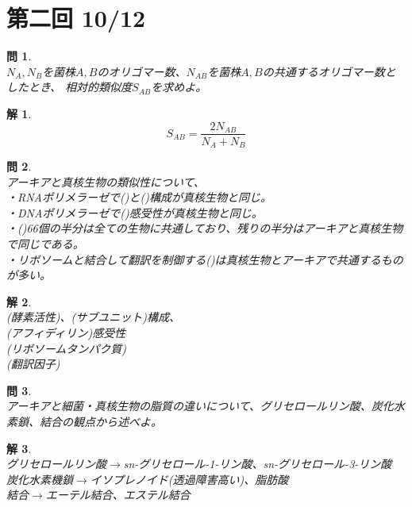 \documentclass{jsarticle}
\newtheorem{pro}{問}[section]
\newtheorem{ans}{解}[section]
\begin{document}
\newpage
\noindent
\section{第二回 10/12}
\noindent
\begin{pro}~\\
    \(N_{A},N_{B}\)を菌株\(A,B\)のオリゴマー数、\(N_{AB}\)を菌株\(A,B\)の共通するオリゴマー数としたとき、
    相対的類似度\(S_{AB}\)を求めよ。
\end{pro}
\begin{ans}~\\
    \[S_{AB}=\frac{2N_{AB}}{N_{A}+N_{B}}\]
\end{ans}

\begin{pro}~\\
    アーキアと真核生物の類似性について、\\
    ・RNAポリメラーゼで(\hspace{5mm})と(\hspace{5mm})構成が真核生物と同じ。\\
    ・DNAポリメラーゼで(\hspace{5mm})感受性が真核生物と同じ。\\
    ・(\hspace{5mm})66個の半分は全ての生物に共通しており、残りの半分はアーキアと真核生物で同じである。\\
    ・リボソームと結合して翻訳を制御する(\hspace{5mm})は真核生物とアーキアで共通するものが多い。
\end{pro}
\begin{ans}~\\
    (酵素活性)、(サブユニット)構成、\\
    (アフィディリン)感受性\\
    (リボソームタンパク質)\\
    (翻訳因子)\\
\end{ans}

\begin{pro}~\\
    アーキアと細菌・真核生物の脂質の違いについて、グリセロールリン酸、炭化水素鎖、結合の観点から述べよ。
\end{pro}
\begin{ans}~\\
    グリセロールリン酸\(\longrightarrow\)sn-グリセロール-1-リン酸、sn-グリセロール-3-リン酸\\
    炭化水素機鎖\(\longrightarrow\)イソプレノイド(透過障害高い)、脂肪酸\\
    結合\(\longrightarrow\)エーテル結合、エステル結合
\end{ans}
\end{document}
